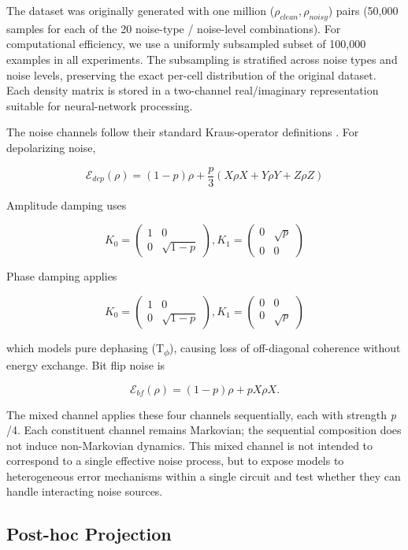 \documentclass[11pt]{article}
\begin{document}
The dataset was originally generated with one million (\(\rho_{clean}, \rho_{noisy}\)) pairs (50,000 samples for each of the 20 noise-type / noise-level combinations). For computational efficiency, we use a uniformly subsampled subset of 100,000 examples in all experiments. The subsampling is stratified across noise types and noise levels, preserving the exact per-cell distribution of the original dataset. Each density matrix is stored in a two-channel real/imaginary representation suitable for neural-network processing.

The noise channels follow their standard Kraus-operator definitions \citep{nielsen_chuang_2010}. For depolarizing noise,

$$
\mathcal{E}_{dep}(\rho) = (1-p)\rho + \frac{p}{3}(X \rho X + Y \rho Y + Z \rho Z)
$$

Amplitude damping uses

$$
K_0 = \begin{pmatrix}
1 & 0\\
0 & \sqrt{1-p}
\end{pmatrix},
 K_1 = \begin{pmatrix}
0 & \sqrt{p}\\
0 & 0
\end{pmatrix}
$$

Phase damping applies

$$
K_0 = \begin{pmatrix}
1 & 0\\
0 & \sqrt{1-p}
\end{pmatrix},
K_1 = \begin{pmatrix}
0 & 0\\
0 & \sqrt{p}
\end{pmatrix}
$$

which models pure dephasing (T\textsubscript{\(\phi\)}), causing loss of off-diagonal coherence without energy exchange. Bit flip noise is

$$
\mathcal{E}_{bf}(\rho) = (1-p)\rho + p X \rho X.
$$

The mixed channel applies these four channels sequentially, each with strength \emph{p} /4. Each constituent channel remains Markovian; the sequential composition does not induce non-Markovian dynamics. This mixed channel is not intended to correspond to a single effective noise process, but to expose models to heterogeneous error mechanisms within a single circuit and test whether they can handle interacting noise sources.

\newpage
\subsection{Post-hoc Projection}
\label{sec:org168ced8}
\end{document}
